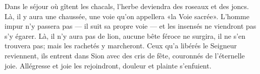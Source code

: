 Dans le séjour où gîtent les chacals,
	l’herbe deviendra des roseaux et des joncs.
Là, il y aura une chaussée,
	une voie qu’on appellera «la Voie sacrée».
L’homme impur n’y passera pas --- il suit sa propre voie ---
	et les insensés ne viendront pas s’y égarer.
Là, il n’y aura pas de lion,
	aucune bête féroce ne surgira, il ne s’en trouvera pas;
	mais les rachetés y marcheront.
Ceux qu’a libérés le Seigneur reviennent,
	ils entrent dans Sion avec des cris de fête, couronnés de l’éternelle joie.
Allégresse et joie les rejoindront,
	douleur et plainte s’enfuient.
